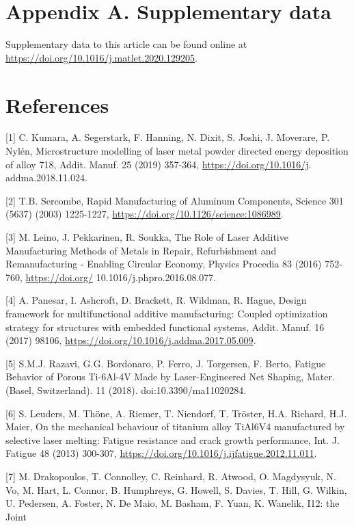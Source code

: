 \documentclass[10pt]{article}
\begin{document}
\section*{Appendix A. Supplementary data}
Supplementary data to this article can be found online at \href{https://doi.org/10.1016/j.matlet.2020.129205}{https://doi.org/10.1016/j.matlet.2020.129205}.

\section*{References}
[1] C. Kumara, A. Segerstark, F. Hanning, N. Dixit, S. Joshi, J. Moverare, P. Nylén, Microstructure modelling of laser metal powder directed energy deposition of alloy 718, Addit. Manuf. 25 (2019) 357-364, \href{https://doi.org/10.1016/j}{https://doi.org/10.1016/j}. addma.2018.11.024.

[2] T.B. Sercombe, Rapid Manufacturing of Aluminum Components, Science 301 (5637) (2003) 1225-1227, \href{https://doi.org/10.1126/science:1086989}{https://doi.org/10.1126/science:1086989}.

[3] M. Leino, J. Pekkarinen, R. Soukka, The Role of Laser Additive Manufacturing Methods of Metals in Repair, Refurbishment and Remanufacturing - Enabling Circular Economy, Physics Procedia 83 (2016) 752-760, \href{https://doi.org/}{https://doi.org/} 10.1016/j.phpro.2016.08.077.

[4] A. Panesar, I. Ashcroft, D. Brackett, R. Wildman, R. Hague, Design framework for multifunctional additive manufacturing: Coupled optimization strategy for structures with embedded functional systems, Addit. Manuf. 16 (2017) 98106, \href{https://doi.org/10.1016/j.addma.2017.05.009}{https://doi.org/10.1016/j.addma.2017.05.009}.

[5] S.M.J. Razavi, G.G. Bordonaro, P. Ferro, J. Torgersen, F. Berto, Fatigue Behavior of Porous Ti-6Al-4V Made by Laser-Engineered Net Shaping, Mater. (Basel, Switzerland). 11 (2018). doi:10.3390/ma11020284.

[6] S. Leuders, M. Thöne, A. Riemer, T. Niendorf, T. Tröster, H.A. Richard, H.J. Maier, On the mechanical behaviour of titanium alloy TiAl6V4 manufactured by selective laser melting: Fatigue resistance and crack growth performance, Int. J. Fatigue 48 (2013) 300-307, \href{https://doi.org/10.1016/j.ijfatigue.2012.11.011}{https://doi.org/10.1016/j.ijfatigue.2012.11.011}.

[7] M. Drakopoulos, T. Connolley, C. Reinhard, R. Atwood, O. Magdysyuk, N. Vo, M. Hart, L. Connor, B. Humphreys, G. Howell, S. Davies, T. Hill, G. Wilkin, U. Pedersen, A. Foster, N. De Maio, M. Basham, F. Yuan, K. Wanelik, I12: the Joint
\end{document}

